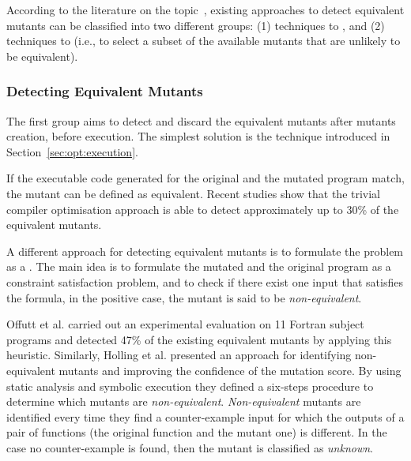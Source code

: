 According to the literature on the topic~\cite{madeyski2013overcoming}, existing approaches to detect equivalent mutants can be classified into two different groups: (1) techniques to , and (2) techniques to  (i.e., to select a subset of the available mutants that are unlikely to be equivalent).

\subsubsection{Detecting Equivalent Mutants}

The first group aims to detect and discard the equivalent mutants after mutants creation, before execution. The simplest solution is the  \cite{papadakis2015trivial, kintis2017detecting,papadakis2019mutation} technique introduced in Section~\ref{sec:opt:execution}. 

If the executable code generated for the original and the mutated program match, the mutant can be defined as equivalent.
Recent studies \cite{papadakis2015trivial} show that the trivial compiler optimisation approach is able to detect approximately up to 30\% of the equivalent mutants.

A different approach for detecting equivalent mutants is to formulate the problem as a . 
The main idea is to formulate the mutated and the original program as a constraint satisfaction problem, and to check if there exist one input that satisfies the formula, in the positive case, the mutant is said to be \textit{non-equivalent}.

Offutt et al. \cite{offutt1996detecting,offutt1997automatically} carried out an experimental evaluation on 11 Fortran subject programs and detected 47\% of the existing equivalent mutants by applying this heuristic.
Similarly, Holling et al. \cite{holling2016nequivack,papadakis2012mutation} presented an approach for identifying non-equivalent mutants and improving the confidence of the mutation score. By using static analysis and symbolic execution they defined a six-steps procedure to determine which mutants are \textit{non-equivalent}. \textit{Non-equivalent} mutants are identified every time they find a counter-example input for which the outputs of a pair of functions (the original function and the mutant one) is different. In the case no counter-example is found, then the mutant is classified as \textit{unknown}. 

